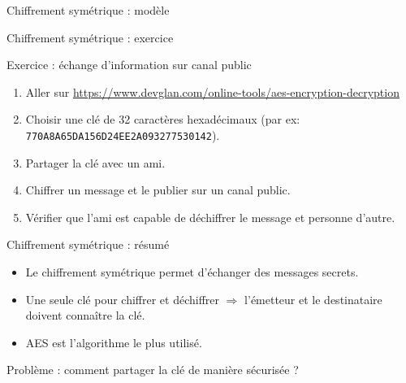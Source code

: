 \begin{frame}{Chiffrement symétrique : modèle}
  
\end{frame}

\begin{frame}{Chiffrement symétrique : exercice}
  \begin{block}{Exercice : échange d'information sur canal public}
    \begin{enumerate}
      \item Aller sur \url{https://www.devglan.com/online-tools/aes-encryption-decryption}
      \item Choisir une clé de 32 caractères hexadécimaux (par ex: \texttt{770A8A65DA156D24EE2A093277530142}).
      \item Partager la clé avec un ami.
      \item Chiffrer un message et le publier sur un canal public.
      \item Vérifier que l'ami est capable de déchiffrer le message et personne d'autre.
    \end{enumerate}
  \end{block}
\end{frame}

\begin{frame}{Chiffrement symétrique : résumé}
  \begin{itemize}
    \item Le chiffrement symétrique permet d'échanger des messages secrets.
    \item Une seule clé pour chiffrer et déchiffrer $\Rightarrow$ l'émetteur et le destinataire doivent connaître la clé.
    \item AES est l'algorithme le plus utilisé.
  \end{itemize}

  Problème : comment partager la clé de manière sécurisée ?
\end{frame}

